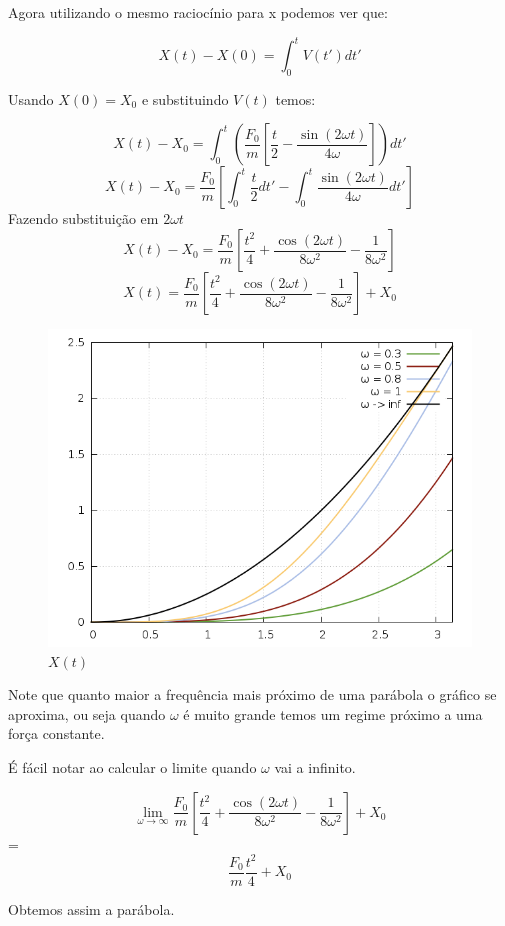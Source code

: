 \documentclass[a4paper,12pt]{article}
\begin{document}
	Agora utilizando o mesmo raciocínio para x podemos ver que:
	
	\[ X(t) - X(0) = \int_{0}^{t} V(t') dt' \]
	
	Usando $X(0)=X_0$ e substituindo $V(t)$ temos:
	
	
	\[ X(t) - X_0 = \int_{0}^{t} \left( \frac{F_0}{m} \left[\frac{t}{2}-\frac{\sin(2\omega t)}{4\omega}\right] \right)  dt' \]
	\[ X(t) - X_0 = \frac{F_0}{m} \left[ \int_{0}^{t} \frac{t}{2} dt' - \int_{0}^{t}  \frac{\sin(2\omega t)}{4\omega} dt'\right] \]
	Fazendo substituição em $2\omega t $
	\[ X(t) - X_0 = \frac{F_0}{m} \left[ \frac{t^2}{4} + \frac{\cos(2\omega t)}{8\omega^2} - \frac{1}{8\omega^2}\right] \]
	\[ X(t)= \frac{F_0}{m} \left[ \frac{t^2}{4} + \frac{\cos(2\omega t)}{8\omega^2} - \frac{1}{8\omega^2}\right] + X_0 \]
		
		
		\begin{figure}[h]
			\centering
			\includegraphics[scale=0.6]{1o3.png}
			\caption{$X(t)$}
		\end{figure}
		
		Note que quanto maior a frequência mais próximo de uma parábola o gráfico se aproxima, ou seja quando $\omega$ é muito grande temos um regime próximo a uma
		força constante.
		
		É fácil notar ao calcular o limite quando $\omega $ vai a infinito.
		
		\[ \lim_{\omega \rightarrow \infty} \frac{F_0}{m} \left[ \frac{t^2}{4} + \frac{\cos(2\omega t)}{8\omega^2} - \frac{1}{8\omega^2}\right] + X_0 \] = 		
		\[ \frac{F_0}{m} \frac{t^2}{4} + X_0 \]
		
		Obtemos assim a parábola.
		
\end{document}
